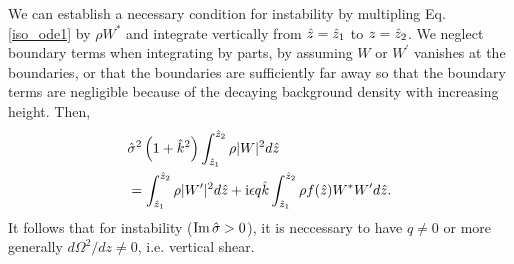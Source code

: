 We can establish a necessary condition for instability by multipling
Eq. \ref{iso_ode1} by $\rho W^*$ and integrate vertically from
$\hat{z}=\hat{z}_1$ to $z=\hat{z}_2$. We neglect boundary 
terms when integrating by parts, by assuming $W$ or
$W^\prime$ vanishes at the boundaries, or that the boundaries are 
sufficiently far away so that the boundary terms are negligible because of the
decaying background density with increasing height. Then,
\begin{align}
  &\hat{\sigma}^2\left(1+\hat{k}^2\right)\int_{\hat{z}_1}^{\hat{z}_2}\rho|W|^2d\hat{z} \notag\\
  &=\int_{\hat{z}_1}^{\hat{z}_2}\rho|W^\prime|^2d\hat{z} 
  +\mathrm{i} \epsilon q \hat{k}\int_{\hat{z}_1}^{\hat{z}_2}\rho f(\hat{z}) W^*W^\prime d\hat{z}.\label{integral_relation1}
\end{align}
It follows that for instability ($\operatorname{Im}\hat{\sigma}>0$), it is neccessary to
have $q\neq0$ or more generally $d\Omega^2/dz\neq 0$, i.e. vertical shear.  


